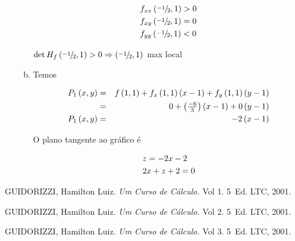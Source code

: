 \documentclass{book}
\begin{document}
\begin{enumerate}
\begin{sol}
\begin{enumerate}[(a)]
\[
\begin{gathered}
  f_{xx} \left( {{\raise0.5ex\hbox{$\scriptstyle { - 1}$}
\kern-0.1em/\kern-0.15em
\lower0.25ex\hbox{$\scriptstyle 2$}},1} \right) > 0 \hfill \\
  f_{xy} \left( {{\raise0.5ex\hbox{$\scriptstyle { - 1}$}
\kern-0.1em/\kern-0.15em
\lower0.25ex\hbox{$\scriptstyle 2$}},1} \right) = 0 \hfill \\
  f_{yy} \left( {{\raise0.5ex\hbox{$\scriptstyle { - 1}$}
\kern-0.1em/\kern-0.15em
\lower0.25ex\hbox{$\scriptstyle 2$}},1} \right) < 0 \hfill \\
\end{gathered}
\]

$\det H_f \left( {{\raise0.5ex\hbox{$\scriptstyle { - 1}$}
\kern-0.1em/\kern-0.15em
\lower0.25ex\hbox{$\scriptstyle 2$}},1} \right) > 0 \Rightarrow \left( {{\raise0.5ex\hbox{$\scriptstyle { - 1}$}
\kern-0.1em/\kern-0.15em
\lower0.25ex\hbox{$\scriptstyle 2$}},1} \right)$ max local

\newpage 

    \item Temos

\begin{eqnarray*}
  P_1 \left( {x,y} \right) &=& f\left( {1,1} \right) + f_x \left( {1,1} \right)\left( {x - 1} \right) + f_y \left( {1,1} \right)\left( {y - 1} \right) \hfill \\
   &=& 0 + \left( {\tfrac{{ - 6}}{3}} \right)\left( {x - 1} \right) + 0\left( {y - 1} \right) \hfill \\
  P_1 \left( {x,y} \right) &=&  - 2\left( {x - 1} \right) \hfill \\
\end{eqnarray*}

O plano tangente ao gr\'afico \'e

\[
\begin{gathered}
  z =  - 2x - 2 \hfill \\
  2x + z + 2 = 0 \hfill \\
\end{gathered}
\]


  \end{enumerate}
\end{sol}

\end{enumerate}


\begin{thebibliography}{99}

 GUIDORIZZI, Hamilton Luiz. {\sl Um Curso de C\'alculo.} Vol 1. 5\textordfeminine\ Ed. LTC, 2001.

 GUIDORIZZI, Hamilton Luiz. {\sl Um Curso de C\'alculo.} Vol 2. 5\textordfeminine\ Ed. LTC, 2001.

 GUIDORIZZI, Hamilton Luiz. {\sl Um Curso de C\'alculo.} Vol 3. 5\textordfeminine\ Ed. LTC, 2001.

\end{thebibliography}

\printindex
\end{document}
